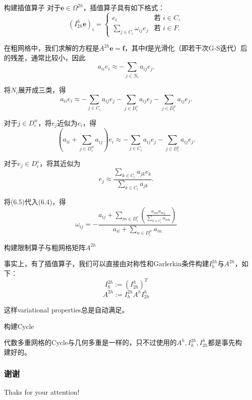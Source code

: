 \documentclass[9pt]{beamer}
\begin{document}
\begin{frame}{构建插值算子}
\tiny
对于$\mathbf{e}\in\Omega^{2h}$，插值算子具有如下格式：
\begin{equation}
  (I_{2h}^h \mathbf{e})_i=\left\{
    \begin{array}{ll}
      e_i & \text{若 }i\in C,\\
      \sum_{j\in C_i}\omega_{ij}e_j & \text{若 }i\in F.
    \end{array}
  \right.
\end{equation}

\pause
在粗网格中，我们求解的方程是$A^{2h}\mathbf{e}=\mathbf{f}$，其中$\mathbf{f}$是光滑化（即若干次G-S迭代）后的残差，通常比较小，因此
\begin{equation*}
  a_{ii}e_i\approx -\sum_{j\in N_i} a_{ij}e_j.
\end{equation*}

\pause
将$N_i$展开成三类，得
\begin{equation}
  a_{ii}e_i\approx -\sum_{j\in C_i} a_{ij}e_j -\sum_{j\in D^s_i} a_{ij}e_j -\sum_{j\in D^w_i} a_{ij}e_j.
\end{equation}

\pause
对于$j\in D^w_i$，将$e_j$近似为$e_i$，得
\begin{equation}
  \left(a_{ii}+\sum_{j\in D^w_i} a_{ij}\right)e_i\approx -\sum_{j\in C_i} a_{ij}e_j -\sum_{j\in D^s_i} a_{ij}e_j.
\end{equation}

\pause
对于$e_j\in D_i^s$，将其近似为
\begin{equation}
  e_j\approx \frac{\sum_{k\in C_i} a_{jk}e_k}{\sum_{k\in C_i} a_{jk}}.
\end{equation}

\pause
将(6.5)代入(6.4)，得
\begin{equation}
  \omega_{ij}=-\frac{a_{ij}+\sum\limits_{m\in D_i^s}\left(\frac{a_{im}a_{mj}}{\sum\limits_{k\in C_i} a_{mk}}\right)}{a_{ii}+\sum\limits_{n\in D_i^w} a_{in}}
\end{equation}

\end{frame}

\begin{frame}{构建限制算子与粗网格矩阵$A^{2h}$}

事实上，有了插值算子，我们可以直接由对称性和Garlerkin条件构建$I_{h}^{2h}$与$A^{2h}$，如下：
\begin{equation}
  I_{h}^{2h}:=(I_{2h}^{h})^T
\end{equation}
\begin{equation}
  A^{2h}:=I_{h}^{2h}A^hI_{2h}^{h}
\end{equation}

\vspace{1em}
这样variational properties总是自动满足。

\end{frame}

\begin{frame}{构建Cycle}

代数多重网格的Cycle与几何多重是一样的，只不过使用的$A^h,I_h^{2h},I_{2h}^h$都是事先构建好的。

\end{frame}


\begin{frame}
    \frametitle{谢谢}
    \centering
    \Large Thaks for your attention!
\end{frame}
\end{document}

